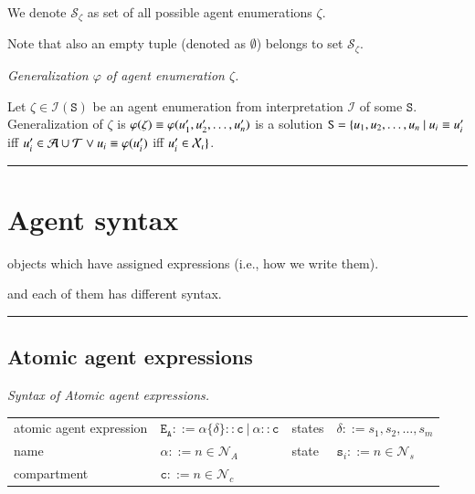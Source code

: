 \documentclass{elsarticle}
\begin{document}
\begin{definition}
We denote $\mathcal{S}_\zeta$ as set of all possible agent enumerations $\zeta$.
\end{definition}

Note that also an empty tuple (denoted as $\emptyset$) belongs to set $\mathcal{S}_\zeta$.

\begin{definition}
\textit{Generalization $\varphi$ of \emph{agent enumeration} $\zeta$.}

Let $\zeta \in \mathcal{I}(\mathtt{S})$ be an agent enumeration from interpretation $\mathcal{I}$ of some $\mathtt{S}$. Generalization of $\zeta$ is $\varphi(\zeta) \equiv \varphi(\emph{u}'_1, \emph{u}'_2, \ldots, \emph{u}'_n)$ is a solution $\mathtt{S} = \{ \emph{u}_1, \emph{u}_2, \ldots, \emph{u}_n ~|~ \emph{u}_i \equiv \emph{u}'_i $ iff $\emph{u}'_i \in \mathcal{A} \cup \mathcal{T} \vee \emph{u}_i \equiv \varphi(\emph{u}'_i) $ iff $ \emph{u}'_i \in \mathcal{X}_\iota \}$.
\end{definition}

\noindent\rule{\textwidth}{1pt}


\section{Agent syntax}

objects which have assigned expressions (i.e., how we write them).

 and each of them has different syntax.


\noindent\rule{\textwidth}{1pt}

\subsection{Atomic agent expressions}

\begin{definition}\label{atomic_syntax}
\textit{Syntax of Atomic agent expressions.}

\begin{center}
{\small
\begin{tabular}{ l l l l }
 atomic agent expression & $\mathtt{E}_\mathtt{A} ::= \alpha\{\delta\}::\mathtt{c} ~|~ \alpha::\mathtt{c}$ & states & $ \delta ::= s_1, s_2, \ldots, s_m$ \\
 name & $\alpha ::= n \in \mathcal{N}_{A}$  & state & $\mathtt{s}_i ::= n \in \mathcal{N}_{s}$\\
 compartment & $\mathtt{c} ::= n \in \mathcal{N}_{c}$\\
\end{tabular}
}
\end{center}
\end{definition}
\end{document}
